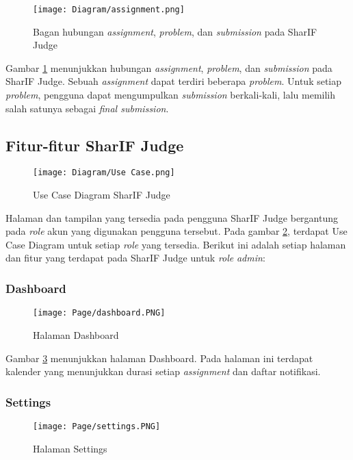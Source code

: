 \begin{figure}[H]
	\centering  
	\texttt{[image: Diagram/assignment.png]}  
	\caption{Bagan hubungan \textit{assignment}, \textit{problem}, dan \textit{submission} pada SharIF Judge}
	\label{fig:3:assignment} 
\end{figure} 

Gambar \ref{fig:3:assignment} menunjukkan hubungan \textit{assignment}, \textit{problem}, dan \textit{submission} pada SharIF Judge. Sebuah \textit{assignment} dapat terdiri beberapa \textit{problem}. Untuk setiap \textit{problem}, pengguna dapat mengumpulkan \textit{submission} berkali-kali, lalu memilih salah satunya sebagai \textit{final submission}.

\subsection{Fitur-fitur SharIF Judge}
\label{subs:3:fitur}

    \begin{figure}[H]
    	\centering  
    	\texttt{[image: Diagram/Use Case.png]}  
    	\caption{Use Case Diagram SharIF Judge}
    	\label{fig:3:usecased} 
    \end{figure} 

Halaman dan tampilan yang tersedia pada pengguna SharIF Judge bergantung pada \textit{role} akun yang digunakan pengguna tersebut. Pada gambar \ref{fig:3:usecased}, terdapat Use Case Diagram untuk setiap \textit{role} yang tersedia. Berikut ini adalah setiap halaman dan fitur yang terdapat pada SharIF Judge untuk \textit{role} \textit{admin}:

\subsubsection{Dashboard}
    \begin{figure}[H]
    	\centering  
    	\texttt{[image: Page/dashboard.PNG]}  
    	\caption{Halaman Dashboard}
    	\label{fig:3:dashboard} 
    \end{figure} 
    
    Gambar \ref{fig:3:dashboard} menunjukkan halaman Dashboard. Pada halaman ini terdapat kalender yang menunjukkan durasi setiap \textit{assignment} dan daftar notifikasi.
    
\subsubsection{Settings}
    \begin{figure}[H]
    	\centering  
    	\texttt{[image: Page/settings.PNG]}  
    	\caption{Halaman Settings}
    	\label{fig:3:settings} 
    \end{figure} 
    

